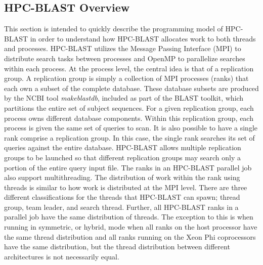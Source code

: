 \documentclass[10pt]{article}
\begin{document}
\subsection{HPC-BLAST Overview} \label{ssec:hpc-overview}

This section is intended to quickly describe the programming model of HPC-BLAST in order to understand how HPC-BLAST allocates work to both threads and processes.  HPC-BLAST utilizes the Message Passing Interface
(MPI) to distribute search tasks between processes and OpenMP to parallelize searches within each process.  At the process level, the central idea is that of a replication group.  A replication group is simply a collection of MPI
processes (ranks) that each own a subset of the complete database.  These database subsets are produced by the NCBI tool \emph{makeblastdb}, included as part of the BLAST toolkit, which partitions the entire set of subject
sequences.  For a given replication group, each process owns different database components.  Within this replication group, each process is given the same set of queries to scan.  It is also possible to have a single rank comprise
a replication group.  In this case, the single rank searches its set of queries against the entire database.  HPC-BLAST allows multiple replication groups to be launched so that different replication groups may search only a portion
of the entire query input file.  The ranks in an HPC-BLAST parallel job also support multithreading.  The distribution of work within the rank using threads is similar to how work is distributed at the MPI level.   There are three different
classifications for the threads that HPC-BLAST can spawn; thread group, team leader, and search thread.  Further, all HPC-BLAST ranks in a parallel job have the same distribution of threads.  The exception to this is when
running in symmetric, or hybrid, mode when all ranks on the host processor have the same thread distribution and all ranks running on the Xeon Phi coprocessors have the same distribution, but the thread distribution between
different architectures is not necessarily equal.  
\end{document}
